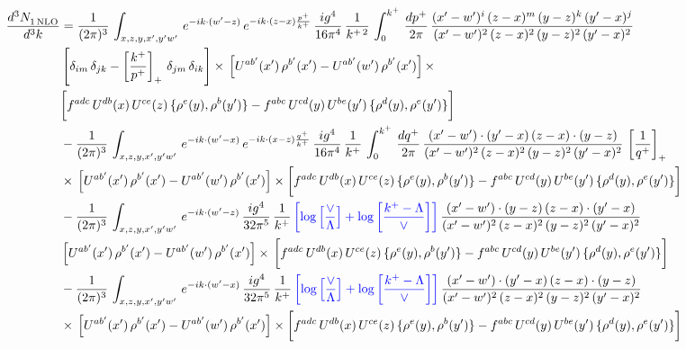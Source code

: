 \documentclass[9pt]{article}
\numberwithin{equation}{section}
\begin{document}
\begin{align}
     \frac{d^{3}N_{1\,\rm NLO}^{\rm}}{d^{3}k}  & = \frac{1}{(2\pi)^{3}}\, \int_{x,z,y,x',y'w'}\,e^{-ik\cdot (w^\prime-z)}\,e^{-ik\cdot (z-x)\frac{p^{+}}{k^{+}}}\,\frac{ig^{4}}{16\pi^{4}}\, \frac{1}{k^{+\,2}}\,\int_{0}^{k^{+}}\, \frac{dp^{+}}{2\pi}\,\frac{(x'-w')^{i}\,(z-x)^{m}\,(y-z)^{k}\,(y'-x)^{j}}{(x'-w')^{2}\,(z-x)^{2}\,(y-z)^{2}\,(y'-x)^{2}}\,\notag \\ & \left[\delta_{im}\,\delta_{jk}-\left[\frac{k^{+}}{p^{+}}\right]_{+}\, \delta_{jm}\,\delta_{ik}\right]\times\, \left[U^{ab'}(x')\,\rho^{b'}(x')-U^{ab'}(w')\,\rho^{b'}(x')\right]\times\notag \\ & \bigg[f^{adc}\,U^{db}(x)\,U^{ce}(z)\, \{\rho^{e}(y),\rho^{b}(y')\}-f^{abc}\,U^{cd}(y)\,U^{be}(y')\, \{\rho^{d}(y),\rho^{e}(y')\}\bigg]\notag \\ & -\frac{1}{(2\pi)^{3}}\, \int_{x,z,y,x',y'w'}\,e^{-ik\cdot (w^\prime-x)}\,e^{-ik\cdot (x-z)\frac{q^{+}}{k^{+}}}\,\frac{ig^{4}}{16\pi^{4}}\, \frac{1}{k^{+}}\,\int_{0}^{k^{+}}\, \frac{dq^{+}}{2\pi}\,\frac{(x'-w')\cdot (y'-x)\,(z-x)\cdot (y-z)}{(x'-w')^{2}\,(z-x)^{2}\,(y-z)^{2}\,(y'-x)^{2}}\,\left[\frac{1}{q^{+}}\right]_{+}\notag \\ & \times\, \left[U^{ab'}(x')\,\rho^{b'}(x')-U^{ab'}(w')\,\rho^{b'}(x')\right]\times \bigg[f^{adc}\,U^{db}(x)\,U^{ce}(z)\, \{\rho^{e}(y),\rho^{b}(y')\}-f^{abc}\,U^{cd}(y)\,U^{be}(y')\, \{\rho^{d}(y),\rho^{e}(y')\}\bigg]\notag \\ & -\frac{1}{(2\pi)^{3}}\, \int_{x,z,y,x',y'w'}\,e^{-ik\cdot (w^\prime-z)}\,\frac{ig^{4}}{32\pi^{5}}\, \frac{1}{k^{+}}\,{\color{blue}\left[\log{\left[\frac{\vee}{\Lambda}\right]} + \log{\left[\frac{k^{+}-\Lambda}{\vee}\right]}\right]}\,\frac{(x'-w')\cdot (y-z)\,(z-x)\cdot (y'-x)}{(x'-w')^{2}\,(z-x)^{2}\,(y-z)^{2}\,(y'-x)^{2}}\,\notag \\ & \left[U^{ab'}(x')\,\rho^{b'}(x')-U^{ab'}(w')\,\rho^{b'}(x')\right]\times\, \bigg[f^{adc}\,U^{db}(x)\,U^{ce}(z)\, \{\rho^{e}(y),\rho^{b}(y')\}-f^{abc}\,U^{cd}(y)\,U^{be}(y')\, \{\rho^{d}(y),\rho^{e}(y')\}\bigg]\notag \\ &  -\frac{1}{(2\pi)^{3}}\, \int_{x,z,y,x',y'w'}\,e^{-ik\cdot (w^\prime-x)}\,\frac{ig^{4}}{32\pi^{5}}\, \frac{1}{k^{+}}\,{\color{blue}\left[\log{\left[\frac{\vee}{\Lambda}\right]} + \log{\left[\frac{k^{+}-\Lambda}{\vee}\right]}\right]}\,\frac{(x'-w')\cdot (y'-x)\,(z-x)\cdot (y-z)}{(x'-w')^{2}\,(z-x)^{2}\,(y-z)^{2}\,(y'-x)^{2}}\notag \\ & \times\, \left[U^{ab'}(x')\,\rho^{b'}(x')-U^{ab'}(w')\,\rho^{b'}(x')\right]\times \bigg[f^{adc}\,U^{db}(x)\,U^{ce}(z)\, \{\rho^{e}(y),\rho^{b}(y')\}-f^{abc}\,U^{cd}(y)\,U^{be}(y')\, \{\rho^{d}(y),\rho^{e}(y')\}\bigg]
\end{align}
\end{document}

